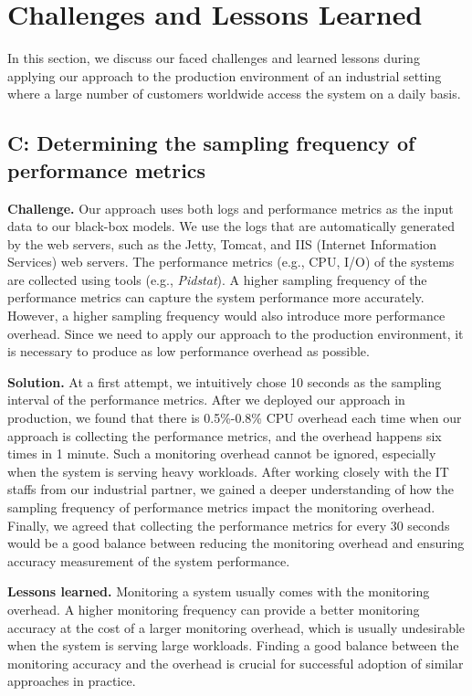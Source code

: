 \section{Challenges and Lessons Learned} \label{sec:challenges}
In this section, we discuss our faced challenges and learned lessons during applying our approach to the production environment of an industrial setting where a large number of customers worldwide access the system on a daily basis.

\setcounter{ChallengeCount}{0}

\subsection*{C: Determining the sampling frequency of performance metrics}
\noindent\textbf{Challenge.}
Our approach uses both logs and performance metrics as the input data to our black-box models. We use the logs that are automatically generated by the web servers, such as the Jetty, Tomcat, and IIS (Internet Information Services) web servers. 
The performance metrics (e.g., CPU, I/O) of the systems are collected using tools (e.g., \emph{Pidstat}).
A higher sampling frequency of the performance metrics can capture the system performance more accurately. However, a higher sampling frequency would also introduce more performance overhead. Since we need to apply our approach to the production environment, it is necessary to produce as low performance overhead as possible.

\noindent\textbf{Solution.}
At a first attempt, we intuitively chose 10 seconds as the sampling interval of the performance metrics. After we deployed our approach in production, we found that there is 0.5\%-0.8\% CPU overhead each time when our approach is collecting the performance metrics, and the overhead happens six times in 1 minute. Such a monitoring overhead cannot be ignored, especially when the system is serving heavy workloads. After working closely with the IT staffs from our industrial partner, we gained a deeper understanding of how the sampling frequency of performance metrics impact the monitoring overhead. Finally, we agreed that collecting the performance metrics for every 30 seconds would be a good balance between reducing the monitoring overhead and ensuring accuracy measurement of the system performance.

\noindent\textbf{Lessons learned.}
Monitoring a system usually comes with the monitoring overhead.
A higher monitoring frequency can provide a better monitoring accuracy at the cost of a larger monitoring overhead, which is usually undesirable when the system is serving large workloads.
Finding a good balance between the monitoring accuracy and the overhead is crucial for successful adoption of similar approaches in practice.


